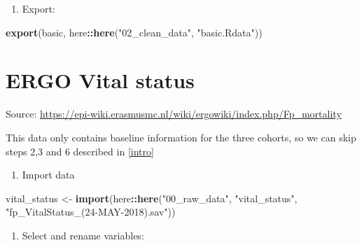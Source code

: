 \documentclass[]{book}
\newenvironment{Shaded}{\begin{snugshade}}{\end{snugshade}}
\newcommand{\DataTypeTok}[1]{\textcolor[rgb]{0.13,0.29,0.53}{#1}}
\newcommand{\KeywordTok}[1]{\textcolor[rgb]{0.13,0.29,0.53}{\textbf{#1}}}
\newcommand{\NormalTok}[1]{#1}
\newcommand{\OperatorTok}[1]{\textcolor[rgb]{0.81,0.36,0.00}{\textbf{#1}}}
\newcommand{\StringTok}[1]{\textcolor[rgb]{0.31,0.60,0.02}{#1}}
\providecommand{\tightlist}{%
  \setlength{\itemsep}{0pt}\setlength{\parskip}{0pt}}
\begin{document}
\begin{enumerate}
\def\labelenumi{\arabic{enumi}.}
\setcounter{enumi}{3}
\tightlist
\item
  Export:
\end{enumerate}

\begin{Shaded}
\begin{Highlighting}[]
\KeywordTok{export}\NormalTok{(basic, here}\OperatorTok{::}\KeywordTok{here}\NormalTok{(}\StringTok{"02_clean_data"}\NormalTok{, }\StringTok{"basic.Rdata"}\NormalTok{))}
\end{Highlighting}
\end{Shaded}

\hypertarget{vital}{%
\chapter{ERGO Vital status}\label{vital}}

Source: \url{https://epi-wiki.erasmusmc.nl/wiki/ergowiki/index.php/Fp_mortality}

This data only contains baseline information for the three cohorts, so we can skip steps 2,3 and 6 described in \ref{intro}

\begin{enumerate}
\def\labelenumi{\arabic{enumi}.}
\tightlist
\item
  Import data
\end{enumerate}

\begin{Shaded}
\begin{Highlighting}[]
\NormalTok{vital_status <-}\StringTok{ }\KeywordTok{import}\NormalTok{(here}\OperatorTok{::}\KeywordTok{here}\NormalTok{(}\StringTok{"00_raw_data"}\NormalTok{, }\StringTok{"vital_status"}\NormalTok{, }\StringTok{"fp_VitalStatus_(24-MAY-2018).sav"}\NormalTok{))}
\end{Highlighting}
\end{Shaded}

\begin{enumerate}
\def\labelenumi{\arabic{enumi}.}
\setcounter{enumi}{1}
\tightlist
\item
  Select and rename variables:
\end{enumerate}

\begin{Shaded}
\end{Shaded}
\end{document}
